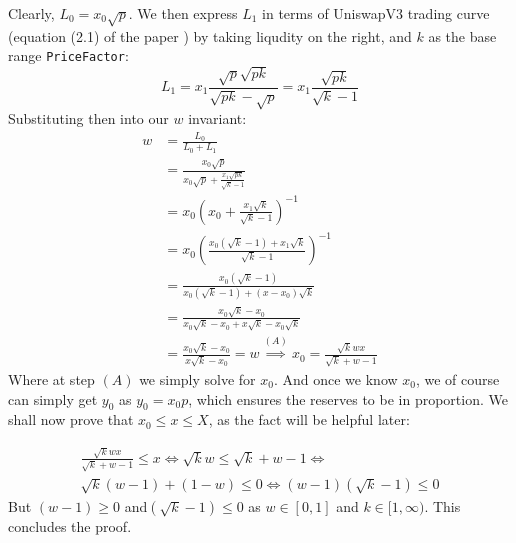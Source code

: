 \documentclass[11pt]{article}
\begin{document}
Clearly, $L_0 = x_0\sqrt p$. We then express $L_1$ in terms of UniswapV3
trading curve (equation (2.1) of the paper \cite{uniswapv3}) by taking
liqudity on the right, and $k$ as the base range \texttt{PriceFactor}:
\[
L_1 = x_1\frac{\sqrt{p}\sqrt{pk}}{\sqrt{pk}-\sqrt{p}}
    = x_1\frac{\sqrt{pk}}{\sqrt k - 1}
\]
Substituting then into our $w$ invariant:
\begin{equation*}
\begin{split}
w &= \frac{L_0}{L_0 + L_1}\\
  &= \frac{x_0\sqrt p}{x_0\sqrt p + \frac{x_1\sqrt{pk}}{\sqrt k - 1}}\\
  &= x_0\left({x_0 + \frac{x_1\sqrt{k}}{\sqrt k - 1}}\right)^{-1}\\
  &= x_0\left(
    \frac{x_0(\sqrt k - 1) + x_1\sqrt k}{\sqrt k - 1}
  \right)^{-1}\\
  &= \frac{x_0(\sqrt k -1)}{x_0(\sqrt k -1) + (x-x_0)\sqrt k}\\
  &= \frac{x_0\sqrt k - x_0}{x_0\sqrt k -x_0 + x\sqrt k - x_0\sqrt k}\\
  &= \frac{x_0\sqrt k - x_0}{x\sqrt k - x_0} =w
  \stackrel{(A)}\implies x_0 = \frac{\sqrt k wx}{\sqrt k + w - 1}
\end{split}
\end{equation*}
Where at step $(A)$ we simply solve for $x_0$. And once we know $x_0$,
we of course can simply get $y_0$ as $y_0 = x_0p$, which ensures the
reserves to be in proportion. We shall now prove that $x_0 \leq x \leq X$,
as the fact will be helpful later:

\begin{equation*}
\begin{split}
\frac{\sqrt k wx}{\sqrt k + w - 1}\leq x\iff
\sqrt k w\leq \sqrt k+w-1\iff\\
\sqrt k(w-1)+(1-w)\leq 0\iff
(w-1)(\sqrt k-1)\leq 0
\end{split}
\end{equation*}
But $(w - 1) \geq 0$ and$(\sqrt k -1) \leq 0$ as $w\in[0, 1]$ and $k\in[1,
\infty)$. This concludes the proof.
\end{document}
